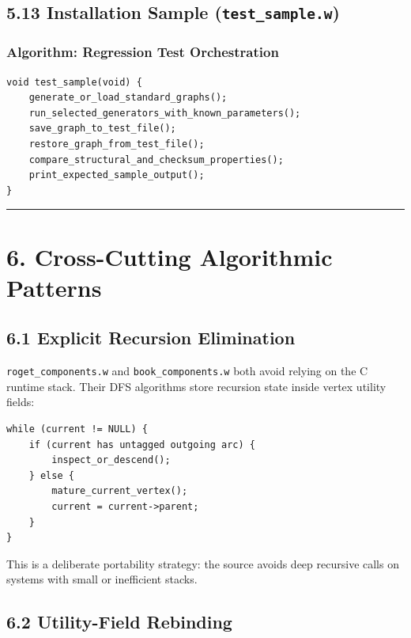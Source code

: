 \documentclass[11pt]{article}
\begin{document}
\subsection{\texorpdfstring{5.13 Installation Sample (\texttt{test\_sample.w})}{5.13 Installation Sample (test\_sample.w)}}\label{installation-sample-test_sample.w}

\subsubsection{Algorithm: Regression Test Orchestration}\label{algorithm-regression-test-orchestration}

\begin{verbatim}
void test_sample(void) {
    generate_or_load_standard_graphs();
    run_selected_generators_with_known_parameters();
    save_graph_to_test_file();
    restore_graph_from_test_file();
    compare_structural_and_checksum_properties();
    print_expected_sample_output();
}
\end{verbatim}

\begin{center}\rule{0.5\linewidth}{0.5pt}\end{center}

\section{6. Cross-Cutting Algorithmic Patterns}\label{cross-cutting-algorithmic-patterns}

\subsection{6.1 Explicit Recursion Elimination}\label{explicit-recursion-elimination}

\texttt{roget\_components.w} and \texttt{book\_components.w} both avoid relying on the C runtime stack. Their DFS algorithms store recursion state inside vertex utility fields:

\begin{verbatim}
while (current != NULL) {
    if (current has untagged outgoing arc) {
        inspect_or_descend();
    } else {
        mature_current_vertex();
        current = current->parent;
    }
}
\end{verbatim}

This is a deliberate portability strategy: the source avoids deep recursive calls on systems with small or inefficient stacks.

\subsection{6.2 Utility-Field Rebinding}\label{utility-field-rebinding}
\end{document}
